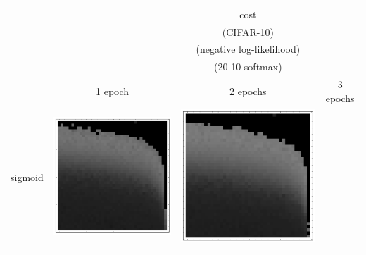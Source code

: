 \documentclass[10pt]{article}
\begin{document}
\begin{tabular}{|c|c|c|c|}
        \hline
        & & {\LARGE cost} & \\
        & & (CIFAR-10) & \\
        & & (negative log-likelihood) & \\
        & & (20-10-softmax) & \\
        \hline
         & 1 epoch & 2 epochs & 3 epochs\\ \hline
sigmoid 
        & \includegraphics[scale=0.25]{plots/simple/LF-20S10S-20T10-CIFAR-1.png}
        & \includegraphics[scale=0.25]{plots/simple/LF-20S10S-20T10-CIFAR-2.png}

\end{tabular}
\end{document}
